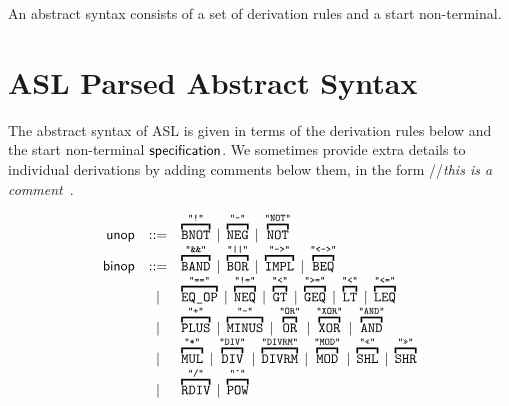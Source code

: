 \documentclass{book}
\begin{document}
\newpage

An abstract syntax consists of a set of derivation rules and a start non-terminal.

\newcommand\ASTComment[1]{//\quad\textit{#1}\ }

\section{ASL Parsed Abstract Syntax}

The abstract syntax of ASL is given in terms of the derivation rules below and the start non-terminal $\textsf{specification}$.
%
We sometimes provide extra details to individual derivations by adding comments below them, in the form \ASTComment{this is a comment}.

\[
\begin{array}{rcl}
\unop &::=& \overname{\BNOT}{\texttt{"!"}} \;|\; \overname{\NEG}{\texttt{"-"}} \;|\; \overname{\NOT}{\texttt{"NOT"}} \\
\binop  &::=& \overname{\BAND}{\texttt{"\&\&"}} \;|\; \overname{\BOR}{\texttt{"||"}} \;|\; \overname{\IMPL}{\texttt{"-->"}}
              \;|\; \overname{\BEQ}{\texttt{"<->"}}  \\
        &|& \overname{\EQOP}{\texttt{"=="}} \;|\; \overname{\NEQ}{\texttt{"!="}} \;|\; \overname{\GT}{\texttt{"<"}}
        \;|\; \overname{\GEQ}{\texttt{">="}} \;|\; \overname{\LT}{\texttt{"<"}} \;|\; \overname{\LEQ}{\texttt{"<="}} \\
        &|& \overname{\PLUS}{\texttt{"+"}} \;|\; \overname{\MINUS}{\texttt{"-"}} \;|\; \overname{\OR}{\texttt{"OR"}}
        \;|\; \overname{\EOR}{\texttt{"XOR"}} \;|\; \overname{\AND}{\texttt{"AND"}} \\
        &|& \overname{\MUL}{\texttt{"*"}} \;|\; \overname{\DIV}{\texttt{"DIV"}} \;|\; \overname{\DIVRM}{\texttt{"DIVRM"}}
        \;|\; \overname{\MOD}{\texttt{"MOD"}} \;|\; \overname{\SHL}{\texttt{"<<"}}  \;|\; \overname{\SHR}{\texttt{">>"}} \\
        &|& \overname{\RDIV}{\texttt{"/"}} \;|\; \overname{\POW}{\texttt{"\^{}"}} \\



\end{array}\]
\end{document}

